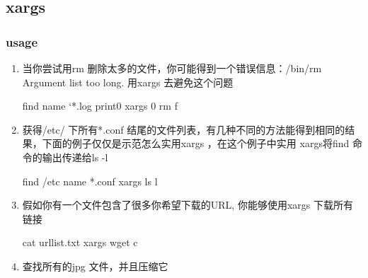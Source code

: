 \documentclass[a4paper,10pt,english]{sphinxmanual}
\begin{document}
\subsection{xargs}
\label{\detokenize{linux/shell:xargs}}

\subsubsection{usage}
\label{\detokenize{linux/shell:id14}}\begin{enumerate}
\item {} 
当你尝试用rm 删除太多的文件，你可能得到一个错误信息：/bin/rm Argument list too long. 用xargs 去避免这个问题

\begin{sphinxVerbatim}[commandchars=\\\{\}]
find \PYGZti{} \PYGZhy{}name ‘*.log\PYGZsq{} \PYGZhy{}print0 \textbar{} xargs \PYGZhy{}0 rm \PYGZhy{}f
\end{sphinxVerbatim}

\item {} 
获得/etc/ 下所有*.conf 结尾的文件列表，有几种不同的方法能得到相同的结果，下面的例子仅仅是示范怎么实用xargs ，在这个例子中实用 xargs将find 命令的输出传递给ls -l

\begin{sphinxVerbatim}[commandchars=\\\{\}]
find /etc \PYGZhy{}name \PYGZdq{}*.conf\PYGZdq{} \textbar{} xargs ls \textendash{}l
\end{sphinxVerbatim}

\item {} 
假如你有一个文件包含了很多你希望下载的URL, 你能够使用xargs 下载所有链接

\begin{sphinxVerbatim}[commandchars=\\\{\}]
cat url\PYGZhy{}list.txt \textbar{} xargs wget \textendash{}c
\end{sphinxVerbatim}

\item {} 
查找所有的jpg 文件，并且压缩它

\begin{sphinxVerbatim}[commandchars=\\\{\}]
           
\end{sphinxVerbatim}


\end{enumerate}
\end{document}
